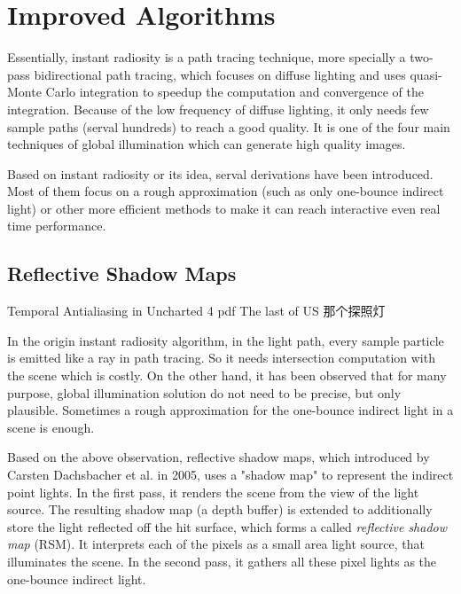 \section{Improved Algorithms}
Essentially, instant radiosity is a path tracing technique, more specially a two-pass bidirectional path tracing, which focuses on diffuse lighting and uses quasi-Monte Carlo integration to speedup the computation and convergence of the integration. Because of the low frequency of diffuse lighting, it only needs few sample paths (serval hundreds) to reach a good quality. It is one of the four main techniques of global illumination which can generate high quality images.

Based on instant radiosity or its idea, serval derivations have been introduced. Most of them focus on a rough approximation (such as only one-bounce indirect light) or other more efficient methods to make it can reach interactive even real time performance.  



\subsection{Reflective Shadow Maps}

Temporal Antialiasing in Uncharted 4 pdf
The last of US 那个探照灯





In the origin instant radiosity algorithm, in the light path, every sample particle is emitted like a ray in path tracing. So it needs intersection computation with the scene which is costly. On the other hand, it has been observed that for many purpose, global illumination solution do not need to be precise, but only plausible. Sometimes a rough approximation for the one-bounce indirect light in a scene is enough. 

Based on the above observation, reflective shadow maps\cite{a:ReflectiveShadowMaps}, which introduced by Carsten Dachsbacher et al. in 2005, uses a "shadow map" to represent the indirect point lights. In the first pass, it renders the scene from the view of the light source. The resulting shadow map (a depth buffer) is extended to additionally store the light reflected off the hit surface, which forms a called \textit{reflective shadow map} (RSM). It interprets each of the pixels as a small area light source, that illuminates the scene. In the second pass, it gathers all these pixel lights as the one-bounce indirect light. 



